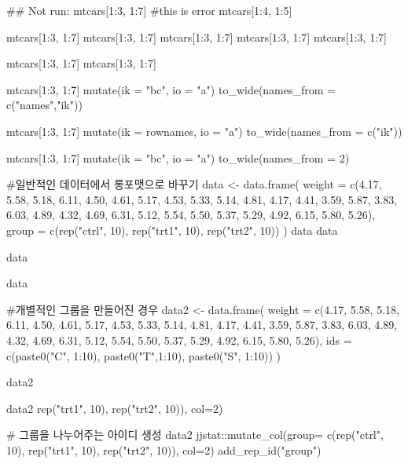\documentclass[a4paper]{book}
\begin{document}
\begin{Examples}
\begin{ExampleCode}


\#\# Not run: 
mtcars[1:3, 1:7]
#this is error
mtcars[1:4, 1:5] %

mtcars[1:3, 1:7] %
mtcars[1:3, 1:7] %
mtcars[1:3, 1:7] %
mtcars[1:3, 1:7] %
mtcars[1:3, 1:7] %

mtcars[1:3, 1:7] %
mtcars[1:3, 1:7] %

mtcars[1:3, 1:7] %
  mutate(ik = "bc", io = "a")%
  to_wide(names_from = c("names","ik"))

mtcars[1:3, 1:7] %
  mutate(ik = rownames, io = "a")%
  to_wide(names_from = c("ik"))%

mtcars[1:3, 1:7] %
  mutate(ik = "bc", io = "a")%
  to_wide(names_from = 2)



#일반적인 데이터에서  롱포맷으로 바꾸기
data <- data.frame(
  weight = c(4.17, 5.58, 5.18, 6.11, 4.50, 4.61, 5.17, 4.53, 5.33, 5.14,
             4.81, 4.17, 4.41, 3.59, 5.87, 3.83, 6.03, 4.89, 4.32, 4.69,
             6.31, 5.12, 5.54, 5.50, 5.37, 5.29, 4.92, 6.15, 5.80, 5.26),
  group = c(rep("ctrl", 10), rep("trt1", 10), rep("trt2", 10))
)
data
data%

data%

data  %


#개별적인 그룹을 만들어진 경우
data2 <- data.frame(
  weight = c(4.17, 5.58, 5.18, 6.11, 4.50, 4.61, 5.17, 4.53, 5.33, 5.14,
             4.81, 4.17, 4.41, 3.59, 5.87, 3.83, 6.03, 4.89, 4.32, 4.69,
             6.31, 5.12, 5.54, 5.50, 5.37, 5.29, 4.92, 6.15, 5.80, 5.26),
  ids = c(paste0("C", 1:10), paste0("T",1:10), paste0("S", 1:10))
)

data2

data2 %
                 rep("trt1", 10), rep("trt2", 10)), col=2)

# 그룹을 나누어주는 아이디 생성
data2 %
jjstat::mutate_col(group= c(rep("ctrl", 10),
        rep("trt1", 10), rep("trt2", 10)), col=2)%
        add_rep_id("group")


\end{ExampleCode}
\end{Examples}
\end{document}
